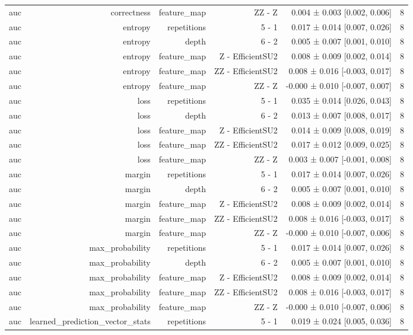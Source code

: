 \begin{table}
\begin{tabular}{lrrrrr}
auc & correctness & feature\_map & ZZ - Z & 0.004 ± 0.003 [0.002, 0.006] & 8 \\
auc & entropy & repetitions & 5 - 1 & 0.017 ± 0.014 [0.007, 0.026] & 8 \\
auc & entropy & depth & 6 - 2 & 0.005 ± 0.007 [0.001, 0.010] & 8 \\
auc & entropy & feature\_map & Z - EfficientSU2 & 0.008 ± 0.009 [0.002, 0.014] & 8 \\
auc & entropy & feature\_map & ZZ - EfficientSU2 & 0.008 ± 0.016 [-0.003, 0.017] & 8 \\
auc & entropy & feature\_map & ZZ - Z & -0.000 ± 0.010 [-0.007, 0.007] & 8 \\
auc & loss & repetitions & 5 - 1 & 0.035 ± 0.014 [0.026, 0.043] & 8 \\
auc & loss & depth & 6 - 2 & 0.013 ± 0.007 [0.008, 0.017] & 8 \\
auc & loss & feature\_map & Z - EfficientSU2 & 0.014 ± 0.009 [0.008, 0.019] & 8 \\
auc & loss & feature\_map & ZZ - EfficientSU2 & 0.017 ± 0.012 [0.009, 0.025] & 8 \\
auc & loss & feature\_map & ZZ - Z & 0.003 ± 0.007 [-0.001, 0.008] & 8 \\
auc & margin & repetitions & 5 - 1 & 0.017 ± 0.014 [0.007, 0.026] & 8 \\
auc & margin & depth & 6 - 2 & 0.005 ± 0.007 [0.001, 0.010] & 8 \\
auc & margin & feature\_map & Z - EfficientSU2 & 0.008 ± 0.009 [0.002, 0.014] & 8 \\
auc & margin & feature\_map & ZZ - EfficientSU2 & 0.008 ± 0.016 [-0.003, 0.017] & 8 \\
auc & margin & feature\_map & ZZ - Z & -0.000 ± 0.010 [-0.007, 0.006] & 8 \\
auc & max\_probability & repetitions & 5 - 1 & 0.017 ± 0.014 [0.007, 0.026] & 8 \\
auc & max\_probability & depth & 6 - 2 & 0.005 ± 0.007 [0.001, 0.010] & 8 \\
auc & max\_probability & feature\_map & Z - EfficientSU2 & 0.008 ± 0.009 [0.002, 0.014] & 8 \\
auc & max\_probability & feature\_map & ZZ - EfficientSU2 & 0.008 ± 0.016 [-0.003, 0.017] & 8 \\
auc & max\_probability & feature\_map & ZZ - Z & -0.000 ± 0.010 [-0.007, 0.006] & 8 \\
auc & learned\_prediction\_vector\_stats & repetitions & 5 - 1 & 0.019 ± 0.024 [0.005, 0.036] & 8 \\

\end{tabular}
\end{table}
